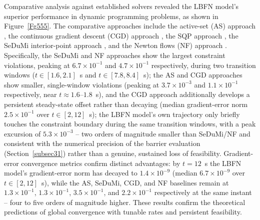 \documentclass[pdflatex,sn-mathphys,Numbered]{sn-jnl}
\theoremstyle{thmstyleone}
\theoremstyle{thmstyletwo}
\theoremstyle{thmstylethree}
\begin{document}
Comparative analysis against established solvers revealed the LBFN model's superior performance in dynamic programming problems, as shown in Figure~\ref{Fg555}. The comparative approaches include the active-set (AS) approach \cite{act-se}, the continuous gradient descent (CGD) approach \cite{CGDSD}, the SQP approach \cite{SQP34}, the SeDuMi interior-point approach \cite{SEDUME}, and the Newton flows (NF) approach \cite{new1}. Specifically, the SeDuMi and NF approaches show the largest constraint violations, peaking at $6.7\times10^{-1}$ and $4.7\times10^{-1}$ respectively, during two transition windows ($t\in[1.6,2.1]$~s and $t\in[7.8,8.4]$~s); the AS and CGD approaches show smaller, single-window violations (peaking at $3.7\times10^{-3}$ and $1.1\times10^{-1}$ respectively, near $t\approx1.6$--$1.8$~s), and the CGD approach additionally develops a persistent steady-state offset rather than decaying (median gradient-error norm $2.5\times10^{-1}$ over $t\in[2,12]$~s); the LBFN model's own trajectory only briefly touches the constraint boundary during the same transition windows, with a peak excursion of $5.3\times10^{-3}$ -- two orders of magnitude smaller than SeDuMi/NF and consistent with the numerical precision of the barrier evaluation (Section~\ref{subsec31}) rather than a genuine, sustained loss of feasibility. Gradient-error convergence metrics confirm distinct advantages: by $t=12$~s the LBFN model's gradient-error norm has decayed to $1.4\times10^{-9}$ (median $6.7\times10^{-9}$ over $t\in[2,12]$~s), while the AS, SeDuMi, CGD, and NF baselines remain at $1.3\times10^{-1}$, $1.3\times10^{-1}$, $3.5\times10^{-1}$, and $2.2\times10^{-1}$ respectively at the same instant -- four to five orders of magnitude higher. These results confirm the theoretical predictions of global convergence with tunable rates and persistent feasibility.
\end{document}

